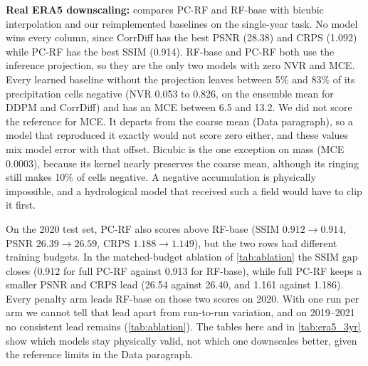 \documentclass[sigconf,nonacm]{acmart}
\newcommand{\pcrf}{\textsc{PC-RF}\xspace}
\begin{document}
\textbf{Real ERA5 downscaling:}  compares \pcrf and RF-base with bicubic interpolation and our reimplemented baselines on the single-year task. No model wins every column, since CorrDiff has the best PSNR (28.38) and CRPS (1.092) while \pcrf has the best SSIM (0.914). RF-base and \pcrf both use the inference projection, so they are the only two models with zero NVR and MCE. Every learned baseline without the projection leaves between 5\% and 83\% of its precipitation cells negative (NVR 0.053 to 0.826, on the ensemble mean for DDPM and CorrDiff) and has an MCE between 6.5 and 13.2. We did not score the reference for MCE. It departs from the coarse mean (Data paragraph), so a model that reproduced it exactly would not score zero either, and these values mix model error with that offset. Bicubic is the one exception on mass (MCE 0.0003), because its kernel nearly preserves the coarse mean, although its ringing still makes 10\% of cells negative. A negative accumulation is physically impossible, and a hydrological model that received such a field would have to clip it first.

On the 2020 test set, \pcrf also scores above RF-base (SSIM $0.912\to0.914$, PSNR $26.39\to26.59$, CRPS $1.188\to1.149$), but the two rows had different training budgets. In the matched-budget ablation of \cref{tab:ablation} the SSIM gap closes (0.912 for full \pcrf against 0.913 for RF-base), while full \pcrf keeps a smaller PSNR and CRPS lead (26.54 against 26.40, and 1.161 against 1.186). Every penalty arm leads RF-base on those two scores on 2020. With one run per arm we cannot tell that lead apart from run-to-run variation, and on 2019--2021 no consistent lead remains (\cref{tab:ablation}). The tables here and in \cref{tab:era5_3yr} show which models stay physically valid, not which one downscales better, given the reference limits in the Data paragraph.
\end{document}
